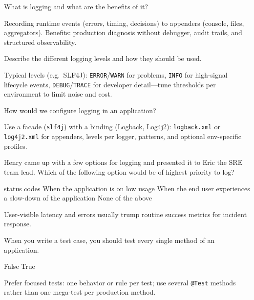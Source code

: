 \newpage


\question[4]
What is logging and what are the benefits of it?
\begin{solutionorbox}[1.25in]
  Recording runtime events (errors, timing, decisions) to appenders (console, files, aggregators). Benefits: production diagnosis without debugger, audit trails, and structured observability.
\end{solutionorbox}

\question[4]
Describe the different logging levels and how they should be used.
\begin{solutionorbox}[1.45in]
  Typical levels (e.g.\ SLF4J): \texttt{ERROR}/\texttt{WARN} for problems, \texttt{INFO} for high-signal lifecycle events, \texttt{DEBUG}/\texttt{TRACE} for developer detail---tune thresholds per environment to limit noise and cost.
\end{solutionorbox}

\question[4]
How would we configure logging in an application?
\begin{solutionorbox}[1.35in]
  Use a facade (\texttt{slf4j}) with a binding (Logback, Log4j2): \texttt{logback.xml} or \texttt{log4j2.xml} for appenders, levels per logger, patterns, and optional env-specific profiles.
\end{solutionorbox}


\newpage


\question[4]
Henry came up with a few options for logging and presented it to Eric the SRE team lead. Which of the following option would be of highest priority to log?
\begin{choices}
   status codes
  \choice When the application is on low usage
  \CorrectChoice When the end user experiences a slow-down of the application
  \choice None of the above
\end{choices}
\begin{solution}
  User-visible latency and errors usually trump routine success metrics for incident response.
\end{solution}

\question[4]
When you write a test case, you should test every single method of an application.
\begin{choices}
  \CorrectChoice False
  \choice True
\end{choices}
\begin{solution}
  Prefer focused tests: one behavior or rule per test; use several \texttt{@Test} methods rather than one mega-test per production method.
\end{solution}

